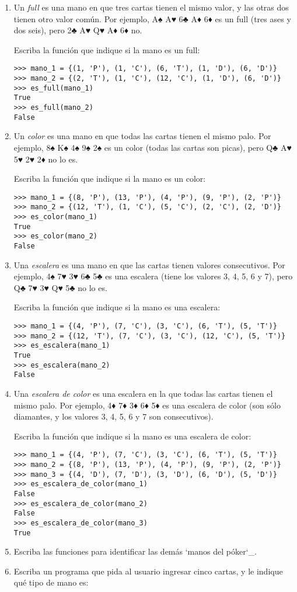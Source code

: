 \begin{enumerate}
\item
  Un \emph{full} es una mano en que tres cartas tienen el mismo valor, y
  las otras dos tienen otro valor común. Por ejemplo, A♠ A♥ 6♣ A♦ 6♦ es
  un full (tres ases y dos seis), pero 2♣ A♥ Q♥ A♦ 6♦ no.

  Escriba la función que indique si la mano es un full:

\begin{lstlisting}
>>> mano_1 = {(1, 'P'), (1, 'C'), (6, 'T'), (1, 'D'), (6, 'D')}
>>> mano_2 = {(2, 'T'), (1, 'C'), (12, 'C'), (1, 'D'), (6, 'D')}
>>> es_full(mano_1)
True
>>> es_full(mano_2)
False
\end{lstlisting}
\item
  Un \emph{color} es una mano en que todas las cartas tienen el mismo
  palo. Por ejemplo, 8♠ K♠ 4♠ 9♠ 2♠ es un color (todas las cartas son
  picas), pero Q♣ A♥ 5♥ 2♥ 2♦ no lo es.

  Escriba la función que indique si la mano es un color:

\begin{lstlisting}
>>> mano_1 = {(8, 'P'), (13, 'P'), (4, 'P'), (9, 'P'), (2, 'P')}
>>> mano_2 = {(12, 'T'), (1, 'C'), (5, 'C'), (2, 'C'), (2, 'D')}
>>> es_color(mano_1)
True
>>> es_color(mano_2)
False
\end{lstlisting}
\item
  Una \emph{escalera} es una mano en que las cartas tienen valores
  consecutivos. Por ejemplo, 4♠ 7♥ 3♥ 6♣ 5♣ es una escalera (tiene los
  valores 3, 4, 5, 6 y 7), pero Q♣ 7♥ 3♥ Q♥ 5♣ no lo es.

  Escriba la función que indique si la mano es una escalera:

\begin{lstlisting}
>>> mano_1 = {(4, 'P'), (7, 'C'), (3, 'C'), (6, 'T'), (5, 'T')}
>>> mano_2 = {(12, 'T'), (7, 'C'), (3, 'C'), (12, 'C'), (5, 'T')}
>>> es_escalera(mano_1)
True
>>> es_escalera(mano_2)
False
\end{lstlisting}
\item
  Una \emph{escalera de color} es una escalera en la que todas las
  cartas tienen el mismo palo. Por ejemplo, 4♦ 7♦ 3♦ 6♦ 5♦ es una
  escalera de color (son sólo diamantes, y los valores 3, 4, 5, 6 y 7
  son consecutivos).

  Escriba la función que indique si la mano es una escalera de color:

\begin{lstlisting}
>>> mano_1 = {(4, 'P'), (7, 'C'), (3, 'C'), (6, 'T'), (5, 'T')}
>>> mano_2 = {(8, 'P'), (13, 'P'), (4, 'P'), (9, 'P'), (2, 'P')}
>>> mano_3 = {(4, 'D'), (7, 'D'), (3, 'D'), (6, 'D'), (5, 'D')}
>>> es_escalera_de_color(mano_1)
False
>>> es_escalera_de_color(mano_2)
False
>>> es_escalera_de_color(mano_3)
True
\end{lstlisting}
\item
  Escriba las funciones para identificar las demás `manos del póker`\_.
\item
  Escriba un programa que pida al usuario ingresar cinco cartas, y le
  indique qué tipo de mano es:
\end{enumerate}
